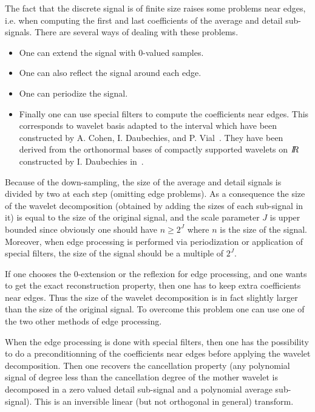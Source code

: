 The fact that the discrete signal is of finite size raises some problems near edges, i.e. when computing the first and last coefficients of the average and detail sub-signals. There are several ways of dealing with these problems. 
\begin{itemize}
\item
One can extend the signal with \( 0 \)-valued samples.
\item
One can also reflect the signal around each edge.
\item
One can periodize the signal.
\item
Finally one can use special filters to compute the coefficients near edges. This corresponds to wavelet basis adapted to the interval which have been constructed by A. Cohen, I. Daubechies, and P. Vial~\cite{cohen.daubechies.ea:wavelets}. 
They have been derived from the orthonormal bases of compactly supported wavelets on \( I\!\!R \) constructed by I. Daubechies in~\cite{daubechies:orthonormal}. 
\end{itemize}

Because of the down-sampling, the size of the average and detail signals is divided by two at each step (omitting edge problems). As a consequence the size of the wavelet decomposition (obtained by adding the sizes of each sub-signal in it) is equal to the size of the original signal, and the scale parameter \( J \) is upper bounded since obviously one should have \( n \geq 2^{J} \) where \( n \) is the size of the signal. Moreover, when edge processing is performed via periodization or application of special filters, the size of the signal should be a multiple of $2^J$.

If one chooses the 0-extension or the reflexion for edge processing, and one wants to get the exact reconstruction property, then one has to keep extra coefficients near edges. Thus the size of the wavelet decomposition is in fact slightly larger than the size of the original signal. To overcome this problem one can use one of the two other methods of edge processing. 

When the edge processing is done with special filters, then one has the possibility to do a preconditionning of the coefficients near edges before applying the wavelet decomposition. Then one recovers the cancellation property (any polynomial signal of degree less than the cancellation degree of the mother wavelet is decomposed in a zero valued detail sub-signal and a polynomial average sub-signal). This is an inversible linear (but not orthogonal in general) transform.

